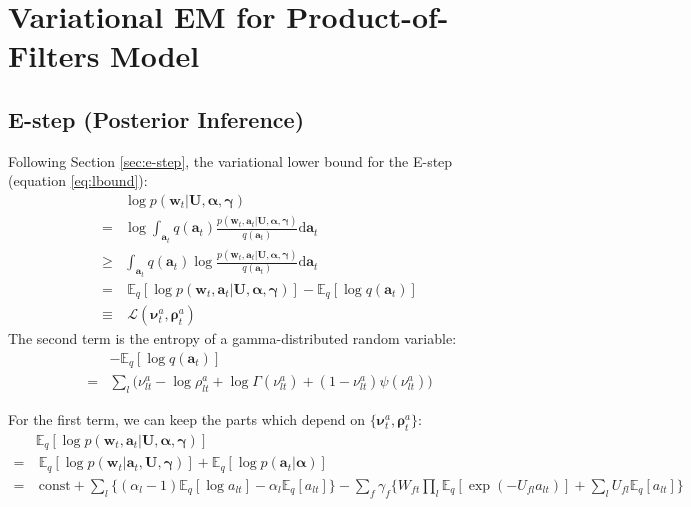 \documentclass{article} %
\begin{document}
\newpage
\appendix

\section{Variational EM for Product-of-Filters Model} \label{app:sf}

\subsection{E-step (Posterior Inference)} \label{app:e}
Following Section \ref{sec:e-step}, the variational lower bound for the E-step (equation \ref{eq:lbound}):
\begin{equation}
\begin{split}
& \log p(\bm{w}_t | \mathbf{U}, \bm{\alpha}, \bm{\gamma})\\
=&  \log \int_{\bm{a}_t} q(\bm{a}_t) \frac{p(\bm{w}_t, \bm{a}_t | \mathbf{U}, \bm{\alpha}, \bm{\gamma})}{q(\bm{a}_t)} \mathrm{d} \bm{a}_t\\
\geq&  \int_{\bm{a}_t} q(\bm{a}_t)  \log \frac{p(\bm{w}_t, \bm{a}_t | \mathbf{U}, \bm{\alpha}, \bm{\gamma})}{q(\bm{a}_t)} \mathrm{d}\bm{a}_t\\
=&~  \mathbb{E}_q [\log p(\bm{w}_t, \bm{a}_t | \mathbf{U}, \bm{\alpha}, \bm{\gamma})] - \mathbb{E}_q [\log q(\bm{a}_t)]\\
\equiv&~  \mathcal{L}(\bm{\nu}^a_t, \bm{\rho}^a_t)
\end{split}
\end{equation}
The second term is the entropy of a gamma-distributed random variable:
\begin{align*}
&-\mathbb{E}_q [\log q(\bm{a}_t)] \\
= &\sum_l \Big( \nu_{lt}^a - \log \rho_{lt}^a + \log \Gamma(\nu^a_{lt}) + (1 - \nu_{lt}^a)\psi(\nu_{lt}^a)\Big)
\end{align*}

For the first term, we can keep the parts which depend on $\{\bm{\nu}^a_t, \bm{\rho}^a_t\}$:
\begin{align*}
& \mathbb{E}_q [\log p(\bm{w}_t, \bm{a}_t | \mathbf{U}, \bm{\alpha}, \bm{\gamma})]  \\
 = &~ \mathbb{E}_q [\log p(\bm{w}_t | \bm{a}_t, \mathbf{U}, \bm{\gamma})] + \mathbb{E}_q [\log p(\bm{a}_t | \bm{\alpha})]  \\
 = & ~\text{const} + \sum_l  \Big\{ (\alpha_l - 1) \mathbb{E}_q [ \log a_{lt} ] - \alpha_l \mathbb{E}_q [ a_{lt} ] \Big\} -  \sum_f \gamma_f \Big\{W_{ft} \prod_{l} \mathbb{E}_q [ \exp(- U_{fl} a_{lt})] +\sum_l U_{fl} \mathbb{E}_q [ a_{lt}] \Big\} 
\end{align*}
\end{document}
